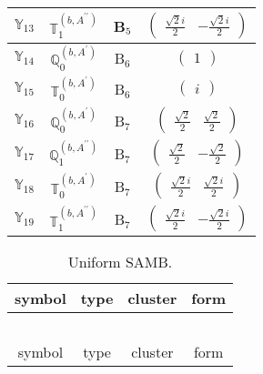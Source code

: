 \documentclass[fleqn,10pt,landscape]{article}
\begin{document}
\begin{itemize}
\begin{center}
\begin{longtable}{c|c|c|c}
$ \mathbb{Y}_{13} $ & $\mathbb{T}_{1}^{(b,A^{\prime\prime})}$ & B$_{5}$ & $\begin{pmatrix} \frac{\sqrt{2} i}{2} & - \frac{\sqrt{2} i}{2} \end{pmatrix}$ \\ \hline
$ \mathbb{Y}_{14} $ & $\mathbb{Q}_{0}^{(b,A^{\prime})}$ & B$_{6}$ & $\begin{pmatrix} 1 \end{pmatrix}$ \\
$ \mathbb{Y}_{15} $ & $\mathbb{T}_{0}^{(b,A^{\prime})}$ & B$_{6}$ & $\begin{pmatrix} i \end{pmatrix}$ \\ \hline
$ \mathbb{Y}_{16} $ & $\mathbb{Q}_{0}^{(b,A^{\prime})}$ & B$_{7}$ & $\begin{pmatrix} \frac{\sqrt{2}}{2} & \frac{\sqrt{2}}{2} \end{pmatrix}$ \\
$ \mathbb{Y}_{17} $ & $\mathbb{Q}_{1}^{(b,A^{\prime\prime})}$ & B$_{7}$ & $\begin{pmatrix} \frac{\sqrt{2}}{2} & - \frac{\sqrt{2}}{2} \end{pmatrix}$ \\
$ \mathbb{Y}_{18} $ & $\mathbb{T}_{0}^{(b,A^{\prime})}$ & B$_{7}$ & $\begin{pmatrix} \frac{\sqrt{2} i}{2} & \frac{\sqrt{2} i}{2} \end{pmatrix}$ \\
$ \mathbb{Y}_{19} $ & $\mathbb{T}_{1}^{(b,A^{\prime\prime})}$ & B$_{7}$ & $\begin{pmatrix} \frac{\sqrt{2} i}{2} & - \frac{\sqrt{2} i}{2} \end{pmatrix}$ \\
\end{longtable}
\end{center}
\begin{center}
\renewcommand{\arraystretch}{1.3}
\begin{longtable}{c|c|c|c}
\caption{Uniform SAMB.}
 \\
 \hline \hline
symbol & type & cluster & form \\ \hline \endfirsthead

\multicolumn{3}{l}{\tablename\ \thetable{}} \\
 \hline \hline
symbol & type & cluster & form \\ \hline \endhead


\end{longtable}
\end{center}
\end{itemize}
\end{document}
